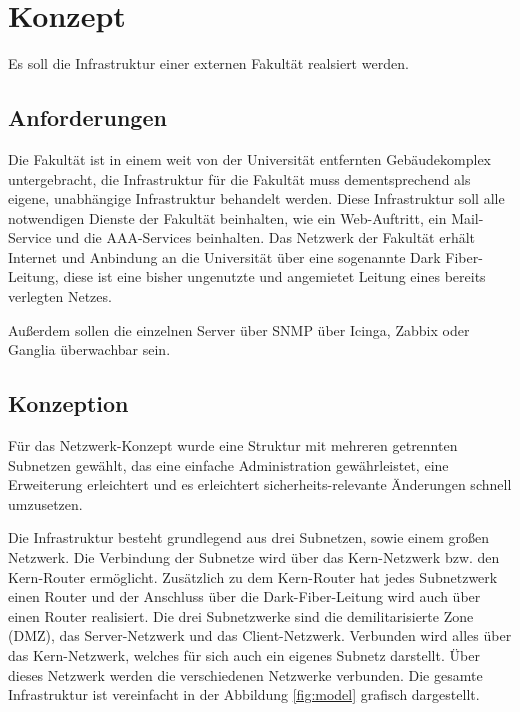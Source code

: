 \chapter{Konzept}
Es soll die Infrastruktur einer externen Fakultät realsiert werden.

\section{Anforderungen}
Die Fakultät ist in einem weit von der Universität entfernten Gebäudekomplex untergebracht, die Infrastruktur für die Fakultät muss dementsprechend als eigene, unabhängige Infrastruktur behandelt werden. Diese Infrastruktur soll alle notwendigen Dienste der Fakultät beinhalten, wie ein Web-Auftritt, ein Mail-Service und die AAA-Services beinhalten.
Das Netzwerk der Fakultät erhält Internet und Anbindung an die Universität über eine sogenannte Dark Fiber-Leitung, diese ist eine bisher ungenutzte und angemietet Leitung eines bereits verlegten Netzes.

Außerdem sollen die einzelnen Server über SNMP über Icinga, Zabbix oder Ganglia überwachbar sein.

\section{Konzeption}
Für das Netzwerk-Konzept wurde eine Struktur mit mehreren getrennten Subnetzen gewählt, das eine einfache Administration gewährleistet, eine Erweiterung erleichtert und es erleichtert sicherheits-relevante Änderungen schnell umzusetzen.

Die Infrastruktur besteht grundlegend aus drei Subnetzen, sowie einem großen Netzwerk. Die Verbindung der Subnetze wird über das Kern-Netzwerk bzw. den Kern-Router ermöglicht. Zusätzlich zu dem Kern-Router hat jedes Subnetzwerk einen Router und der Anschluss über die Dark-Fiber-Leitung wird auch über einen Router realisiert. Die drei Subnetzwerke sind die demilitarisierte Zone (DMZ), das Server-Netzwerk und das Client-Netzwerk.
Verbunden wird alles über das Kern-Netzwerk, welches für sich auch ein eigenes Subnetz darstellt. Über dieses Netzwerk werden die verschiedenen Netzwerke verbunden. Die gesamte Infrastruktur ist vereinfacht in der Abbildung \ref{fig:model} grafisch dargestellt.

